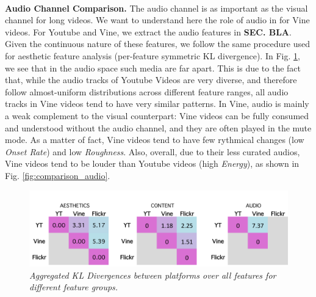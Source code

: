 %
\vspace{3pt}\\\textbf{Audio Channel Comparison.} 
The audio channel is as important as the visual channel for long videos. We want to understand here the role of audio in for Vine videos. For Youtube and Vine, we extract the audio features in \textbf{SEC. BLA}. Given the continuous nature of these features, we follow the same procedure used for  aesthetic feature analysis (per-feature symmetric KL divergence). In Fig. \ref{fig:comparisontable}, we see that in the audio space such media are far apart. This is due to the fact that, while the audio tracks of Youtube Videos are very diverse, and therefore follow almost-uniform distributions across different feature ranges, all audio tracks in Vine videos tend to have very similar patterns. In Vine, audio is mainly a weak complement to the visual counterpart: Vine videos can be fully consumed and understood without the audio channel, and they are often played in the mute mode. As a matter of fact, Vine videos tend to have few rythmical changes (low \emph{Onset Rate}) and low \emph{Roughness}. Also, overall, due to their less curated audios, Vine videos tend to be louder than Youtube videos (high \emph{Energy}), as shown in Fig. \ref{fig:comparison_audio}.

\begin{figure}[!htb]
\centering
\includegraphics[width=\columnwidth]{plots/comparison/table}
\caption{\textsl{ Aggregated KL Divergences between platforms over all features for different feature groups.}}
\label{fig:comparisontable}
\end{figure}

